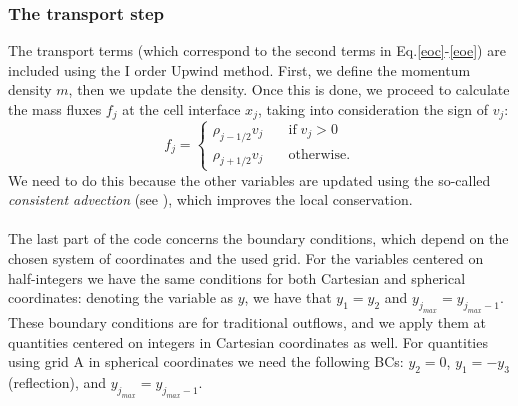 \documentclass{article}
\begin{document}
\subsubsection{The transport step}
The transport terms (which correspond to the second terms in Eq.\eqref{eoc}-\eqref{eoe}) are included using the I order Upwind method. First, we define the momentum density $m$, then we update the density. Once this is done, we proceed to calculate the mass fluxes $f_j$ at the cell interface $x_j$, taking into consideration the sign of $v_j$:
\begin{equation}
	f_j=
	\begin{cases}
		\rho_{j-1/2}v_j \quad &\text{if} \; v_j>0\\
		\rho_{j+1/2}v_j \quad &\text{otherwise}.
	\end{cases}
\end{equation}
We need to do this because the other variables are updated using the so-called \textit{consistent advection} (see \cite[Sec. 4.4]{stone}), which improves the local conservation. \\
\paragraph{}
	The last part of the code concerns the boundary conditions, which depend on the chosen system of coordinates and the used grid. For the variables centered on half-integers we have the same conditions for both Cartesian and spherical coordinates: denoting the variable as $y$, we have that $y_1=y_2$ and $y_{j_{max}}=y_{j_{max}-1}$. These boundary conditions are for traditional outflows, and we apply them at quantities centered on integers in Cartesian coordinates as well. For quantities using grid A in spherical coordinates we need the following BCs: $y_2=0$, $y_1=-y_3$ (reflection), and $y_{j_{max}}=y_{j_{max}-1}$.
\end{document}
